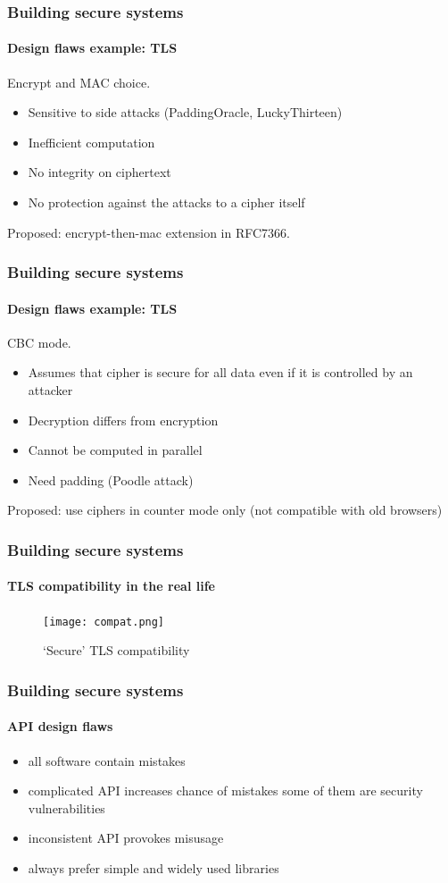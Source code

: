 \documentclass[12pt,t]{beamer}
\begin{document}
\begin{frame}
\frametitle{Building secure systems}
\framesubtitle{Design flaws example: TLS}
Encrypt and MAC choice.
\begin{itemize}
\item Sensitive to side attacks (PaddingOracle, LuckyThirteen)
\item Inefficient computation
\item No integrity on ciphertext
\item No protection against the attacks to a cipher itself
\end{itemize}
Proposed: encrypt-then-mac extension in RFC7366.
\end{frame}

\begin{frame}
\frametitle{Building secure systems}
\framesubtitle{Design flaws example: TLS}
CBC mode.
\begin{itemize}
\item Assumes that cipher is secure for all data even if it is controlled by an attacker
\item Decryption differs from encryption
\item Cannot be computed in parallel
\item Need padding (Poodle attack)
\end{itemize}
Proposed: use ciphers in counter mode only (not compatible with old browsers)
\end{frame}

\begin{frame}
\frametitle{Building secure systems}
\framesubtitle{TLS compatibility in the real life}
\begin{figure}[H]
\texttt{[image: compat.png]}
\caption{`Secure' TLS compatibility}
\end{figure}
\end{frame}

\begin{frame}
\frametitle{Building secure systems}
\framesubtitle{API design flaws}
\begin{itemize}
\item<1-> all software contain mistakes
\item<2-> complicated API increases chance of mistakes some of them are security 
vulnerabilities
\item<3-> inconsistent API provokes misusage
\item<4-> always prefer simple and widely used libraries
\end{itemize}
\end{frame}
\end{document}
